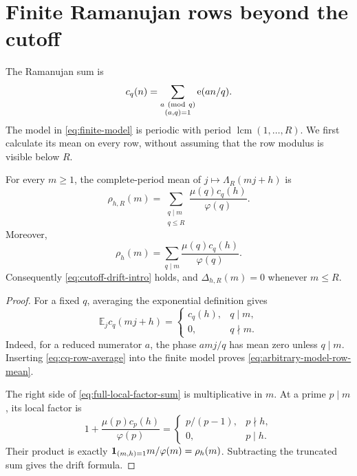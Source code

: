 \section{Finite Ramanujan rows beyond the cutoff}
\label{sec:finite-row-drift}

The Ramanujan sum is
\begin{equation}
 c_q(n)=\sum_{\substack{a\ ({\rm mod}\ q)\\(a,q)=1}}
 \e(an/q).
 \label{eq:ramanujan-sum}
\end{equation}
The model in \eqref{eq:finite-model} is periodic with period
$\operatorname{lcm}(1,\ldots,R)$.  We first calculate its mean on every
row, without assuming that the row modulus is visible below $R$.

\begin{lemma}
\label{lem:arbitrary-row-mean}
For every $m\ge1$, the complete-period mean of
$j\mapsto\Lambda_R(mj+h)$ is
\begin{equation}
 \rho_{h,R}(m)=
 \sum_{\substack{q\mid m\\q\le R}}
 \frac{\mu(q)c_q(h)}{\varphi(q)}.
 \label{eq:arbitrary-model-row-mean}
\end{equation}
Moreover,
\begin{equation}
 \rho_h(m)=
 \sum_{q\mid m}\frac{\mu(q)c_q(h)}{\varphi(q)}.
 \label{eq:full-local-factor-sum}
\end{equation}
Consequently \eqref{eq:cutoff-drift-intro} holds, and
$\Delta_{h,R}(m)=0$ whenever $m\le R$.
\end{lemma}

\begin{proof}
For a fixed $q$, averaging the exponential definition gives
\begin{equation}
 \mathbb E_j c_q(mj+h)=
 \begin{cases}
 c_q(h),&q\mid m,\\
 0,&q\nmid m.
 \end{cases}
 \label{eq:cq-row-average}
\end{equation}
Indeed, for a reduced numerator $a$, the phase $amj/q$ has mean zero
unless $q\mid m$.  Inserting \eqref{eq:cq-row-average} into the finite
model proves \eqref{eq:arbitrary-model-row-mean}.

The right side of \eqref{eq:full-local-factor-sum} is multiplicative in
$m$.  At a prime $p\mid m$, its local factor is
\[
 1+\frac{\mu(p)c_p(h)}{\varphi(p)}
 =\begin{cases}
 p/(p-1),&p\nmid h,\\
 0,&p\mid h.
 \end{cases}
\]
Their product is exactly
$\mathbf 1_{(m,h)=1}m/\varphi(m)=\rho_h(m)$.  Subtracting the truncated sum
gives the drift formula.
\end{proof}

